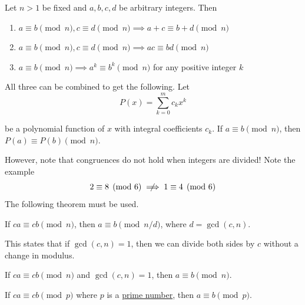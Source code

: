 \documentclass{article}
\newcounter{theorem}[section]
\newcounter{example}[section]
\begin{document}
\begin{theorem}
  \label{thm:arithmetic-properties-of-congruences}
Let $n>1$ be fixed and $a, b, c, d$ be arbitrary integers. Then 
\begin{enumerate}
    \item $a \equiv b \pmod{n}, c \equiv d \pmod{n} \implies a+c \equiv b+d \pmod{n}$
    \item $a \equiv b \pmod{n}, c \equiv d \pmod{n} \implies ac \equiv bd \pmod{n}$
    \item $a \equiv b \pmod{n} \implies a^k \equiv b^k \pmod{n}$ for any positive integer $k$
\end{enumerate}
All three can be combined to get the following. Let 
\begin{equation}
  P(x) = \sum_{k=0}^m c_k x^k
\end{equation}
 
be a polynomial function of $x$ with integral coefficients $c_k$. If $a \equiv b \pmod{n}$, then $P(a) \equiv P(b) \pmod{n}$. 
\end{theorem}

However, note that congruences do not hold when integers are divided! Note the example 
\begin{equation}
  2 \equiv 8 \pmod{6} \centernot\implies 1 \equiv 4 \pmod{6}
\end{equation}
The following theorem must be used. 

\begin{theorem}
  \label{thm:cancellation-in-congruences}
If $ca \equiv cb \pmod{n}$, then $a \equiv b \pmod{n/d}$, where $d = \gcd(c, n)$. 
\end{theorem}

This states that if $\gcd(c, n) = 1$, then we can divide both sides by $c$ without a change in modulus. 

\begin{corollary}
  \label{thm:cancellation-with-a-coprime-factor}
If $ca \equiv cb \pmod{n}$ and $\gcd(c, n) = 1$, then $a \equiv b \pmod{n}$. 
\end{corollary}

\begin{corollary}
  \label{thm:cancellation-modulo-a-prime}
If $ca \equiv cb \pmod{p}$ where $p$ is a \hyperref[def:prime-number]{prime number}, then $a \equiv b \pmod{p}$. 
\end{corollary}
\end{document}
